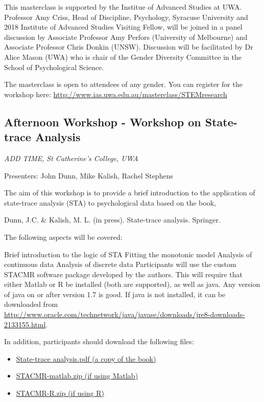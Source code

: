 \documentclass[]{article}
\providecommand{\tightlist}{%
  \setlength{\itemsep}{0pt}\setlength{\parskip}{0pt}}
\begin{document}
This masterclass is supported by the Institue of Advanced Studies at
UWA. Professor Amy Criss, Head of Discipline, Psychology, Syracuse
University and 2018 Institute of Advanced Studies Visiting Fellow, will
be joined in a panel discussion by Associate Professor Amy Perfors
(University of Melbourne) and Associate Professor Chris Donkin (UNSW).
Discussion will be facilitated by Dr Alice Mason (UWA) who is chair of
the Gender Diversity Committee in the School of Psychological Science.

The masterclass is open to attendees of any gender. You can register for
the workshop here:
\url{http://www.ias.uwa.edu.au/masterclass/STEMresearch}

\subsection{Afternoon Workshop - Workshop on State-trace
Analysis}\label{afternoon-workshop---workshop-on-state-trace-analysis}

\emph{ADD TIME, St Catherine's College, UWA }

Presenters: John Dunn, Mike Kalish, Rachel Stephens

The aim of this workshop is to provide a brief introduction to the
application of state-trace analysis (STA) to psychological data based on
the book,

Dunn, J.C. \& Kalish, M. L. (in press). State-trace analysis. Springer.

The following aspects will be covered:

Brief introduction to the logic of STA Fitting the monotonic model
Analysis of continuous data Analysis of discrete data Participants will
use the custom STACMR software package developed by the authors. This
will require that either Matlab or R be installed (both are supported),
as well as java. Any version of java on or after version 1.7 is good. If
java is not installed, it can be downloaded from
\url{http://www.oracle.com/technetwork/java/javase/downloads/jre8-downloads-2133155.html}.

In addition, participants should download the following files:

\begin{itemize}
\tightlist
\item
  \href{https://alicemason.github.io/AMPC18/assets/statetrace/sta.pdf}{State-trace
  analysis.pdf (a copy of the book)}
\item
  \href{https://alicemason.github.io/AMPC18/assets/statetrace/STACMR-matlab.zip}{STACMR-matlab.zip
  (if using Matlab)}
\item
  \href{https://alicemason.github.io/AMPC18/assets/statetrace/STACMR-R.zip}{STACMR-R.zip
  (if using R)}
\end{itemize}
\end{document}
